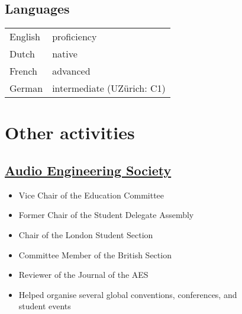 \documentclass[letterpaper]{deedy-resume} %
\begin{document}
{\begin{minipage}[t]{0.33\textwidth}
\sectionspace %
\subsection{Languages}

\begin{tabular}{@{}ll}
English & proficiency\\
Dutch & native\\
French & advanced\\
German & intermediate (UZ\"{u}rich: C1)\\
\end{tabular}


\sectionspace %
\sectionspace %



\section{Other activities} 
\subsection{\href{http://www.aes.org}{Audio Engineering Society}}
\begin{itemize}[noitemsep,nolistsep,leftmargin=*]
\item Vice Chair of the Education Committee
\item Former Chair of the Student Delegate Assembly
\item Chair of the London Student Section
\item Committee Member of the British Section
\item Reviewer of the Journal of the AES
\item Helped organise several global conventions, conferences, and\\ student events
\end{itemize}



\end{minipage}}
\end{document}
